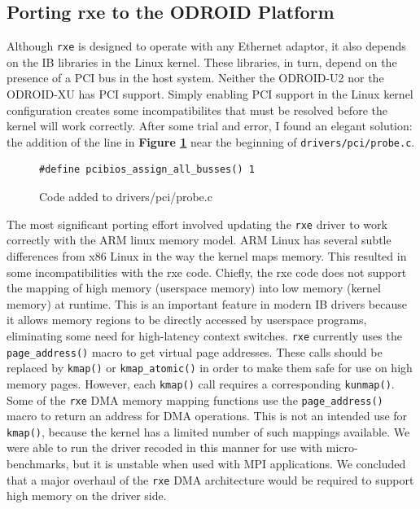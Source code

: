 \documentclass[11pt]{book}
\begin{document}
\subsection{\textbf{Porting rxe to the ODROID Platform}}

Although \verb;rxe; is designed to operate with any Ethernet adaptor, it also
depends on the IB libraries in the Linux kernel. These libraries, in turn,
depend on the presence of a PCI bus in the host system. Neither the ODROID-U2
nor the ODROID-XU has PCI support. Simply enabling PCI support in the Linux
kernel configuration creates some incompatibilites that must be resolved before
the kernel will work correctly. After some trial and error, I found an elegant
solution: the addition of the line in \textbf{Figure \ref{pci_code}} near the
beginning of \verb;drivers/pci/probe.c;.

\begin{figure}[h]
\centering
\begin{verbatim}
#define pcibios_assign_all_busses() 1
\end{verbatim}
\caption{Code added to drivers/pci/probe.c}
\label{pci_code}
\end{figure}

The most significant porting effort involved updating the \verb;rxe; driver to
work correctly with the ARM linux memory model. ARM Linux has several subtle
differences from x86 Linux in the way the kernel maps memory. This resulted in
some incompatibilities with the rxe code. Chiefly, the rxe code does not support
the mapping of high memory (userspace memory) into low memory (kernel memory) at
runtime. This is an important feature in modern IB drivers because it allows
memory regions to be directly accessed by userspace programs, eliminating some
need for high-latency context switches. \verb;rxe; currently uses the
\verb;page_address(); macro to get virtual page addresses. These calls should be
replaced by \verb;kmap(); or \verb;kmap_atomic(); in order to make them safe for
use on high memory pages. However, each \verb;kmap(); call requires a
corresponding \verb;kunmap();. Some of the \verb;rxe; DMA memory mapping
functions use the \verb;page_address(); macro to return an address for DMA
operations. This is not an intended use for \verb;kmap();, because the kernel
has a limited number of such mappings available. We were able to run the driver
recoded in this manner for use with micro-benchmarks, but it is unstable when
used with MPI applications. We concluded that a major overhaul of the \verb;rxe;
DMA architecture would be required to support high memory on the driver side.
\end{document}
